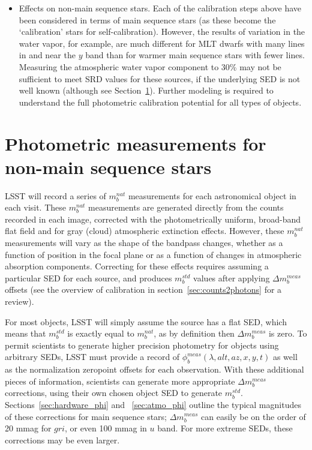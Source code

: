 \documentclass[12pt,preprint]{aastex}
\begin{document}
\begin{itemize}
\item{Effects on non-main sequence stars. Each of the calibration
    steps above have been considered in terms of main sequence
    stars (as these become the `calibration' stars for
    self-calibration). However, the results of variation in the water
    vapor, for example, are much different for MLT dwarfs with
    many lines in and near the $y$ band than for warmer main sequence
    stars with fewer lines. Measuring the atmospheric water vapor
    component to 30\% may not be sufficient to meet SRD values for
    these sources, if the underlying SED is not well known (although
    see Section~\ref{sec:photo_better}).  Further modeling is required
    to understand the full photometric calibration potential for all
    types of objects. }
   

\end{itemize}


\section{Photometric measurements for non-main sequence stars}
\label{sec:photo_better}

LSST will record a series of $m_b^{nat}$ measurements for each
astronomical object in each visit. These $m_b^{nat}$ measurements are
generated directly from the counts recorded in each image, corrected
with the photometrically uniform, broad-band flat field and for gray
(cloud) atmospheric extinction effects. However, these $m_b^{nat}$
measurements will vary as the shape of the bandpass changes, whether
as a function of position in the focal plane or as a function of
changes in atmospheric absorption components. Correcting for these
effects requires assuming a particular SED for each source, and
produces $m_b^{std}$ values after applying $\Delta m_b^{meas}$ offsets
(see the overview of calibration in section~\ref{sec:counts2photons}
for a review).

For most objects, LSST will simply assume the source has a flat SED,
which means that $m_b^{std}$ is exactly equal to $m_b^{nat}$, as by
definition then $\Delta m_b^{meas}$ is zero. To permit scientists to
generate higher precision photometry for objects using arbitrary SEDs,
LSST must provide a record of $\phi_b^{meas}(\lambda,alt,az,x,y,t)$ as
well as the normalization zeropoint offsets for each observation. With
these additional pieces of information, scientists can generate more
appropriate $\Delta m_b^{meas}$ corrections, using their own chosen
object SED to generate $m_b^{std}$. Sections~\ref{sec:hardware_phi}
and ~\ref{sec:atmo_phi} outline the typical magnitudes of these
corrections for main sequence stars; $\Delta m_b^{meas}$ can easily be
on the order of 20 mmag for $gri$, or even 100 mmag in $u$ band. For
more extreme SEDs, these corrections may be even larger.
\end{document}
